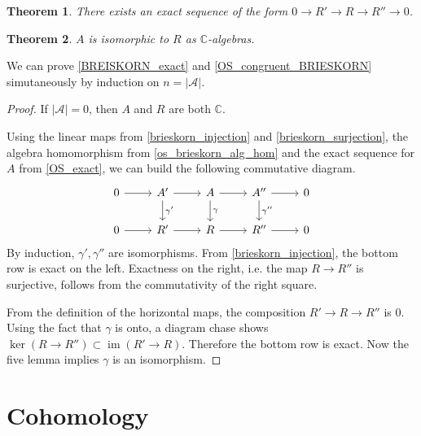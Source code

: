 \documentclass[article,twoside]{article}
\newcommand{\CC}{\mathbb{C}}
\newcommand{\script}[1]{\mathcal{#1}}
\newcommand{\im}{\operatorname{im}}
\theoremstyle{plain}
\newtheorem{theorem}{Theorem}[section]
\theoremstyle{plain}
\theoremstyle{plain}
\theoremstyle{plain}
\theoremstyle{plain}
\theoremstyle{definition}
\theoremstyle{definition}
\theoremstyle{definition}
\theoremstyle{remark}
\theoremstyle{remark}
\begin{document}



\begin{theorem}\label{BREISKORN_exact}
	There exists an exact sequence of the form $0\to R'\to R\to R''\to 0$.
\end{theorem}

\begin{theorem}\label{OS_congruent_BRIESKORN}
	$A$ is isomorphic to $R$ as $\CC$-algebras.
\end{theorem}

We can prove \autoref{BREISKORN_exact} and \autoref{OS_congruent_BRIESKORN} simutaneously by induction on $n=|\script{A}|$.

\begin{proof}
	If $|\script{A}|=0$, then $A$ and $R$ are both $\CC$.

	Using the linear maps from \autoref{brieskorn_injection} and \autoref{brieskorn_surjection}, the algebra homomorphism from \autoref{os_brieskorn_alg_hom} and the exact sequence for $A$ from \autoref{OS_exact}, we can build the following commutative diagram.
	\begin{equation*}
		\begin{tikzcd}
		0\rar & A'\rar\dar{\gamma'} & A\rar\dar{\gamma} & A''\rar\dar{\gamma''} & 0
		\\
		0\rar & R'\rar & R\rar & R''\rar & 0
		\end{tikzcd}
	\end{equation*}
	By induction, $\gamma',\gamma''$ are isomorphisms. From \autoref{brieskorn_injection}, the bottom row is exact on the left. Exactness on the right, i.e. the map $R\to R''$ is surjective, follows from the commutativity of the right square.
	
	From the definition of the horizontal maps, the composition $R'\to R\to R''$ is $0$. Using the fact that $\gamma$ is onto, a diagram chase shows $\ker (R\to R'')\subset \im (R'\to R)$. Therefore the bottom row is exact. Now the five lemma implies $\gamma$ is an isomorphism.
\end{proof}




\section{Cohomology}
\end{document}
